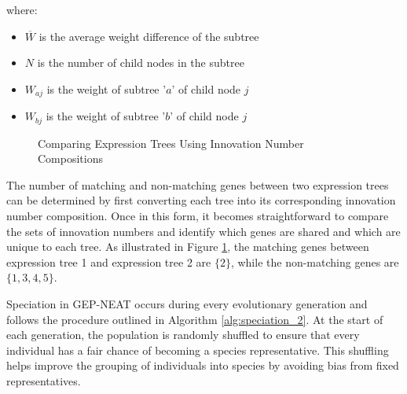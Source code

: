 \noindent where:
\begin{itemize}
	\item $\overline{W}$ is the average weight difference of the subtree
	\item $N$ is the number of child nodes in the subtree
	\item $W_{aj}$ is the weight of subtree '$a$' of child node $j$
	\item $W_{bj}$ is the weight of subtree '$b$' of child node $j$
\end{itemize} 

\parbreak
\begin{figure}[H] %
	\centering %
	\caption{Comparing Expression Trees Using Innovation Number Compositions}
	\label{fig:gep_neat_innovation_number_compare} %
\end{figure}

\parbreak\noindent The number of matching and non-matching genes between two expression trees can be determined by first converting each tree into its corresponding innovation number composition. Once in this form, it becomes straightforward to compare the sets of innovation numbers and identify which genes are shared and which are unique to each tree. As illustrated in Figure \ref{fig:gep_neat_innovation_number_compare}, the matching genes between expression tree 1 and expression tree 2 are $\{2\}$, while the non-matching genes are $\{1, 3, 4, 5\}$.

\parbreak\noindent Speciation in GEP-NEAT occurs during every evolutionary generation and follows the procedure outlined in Algorithm \ref{alg:speciation_2}. At the start of each generation, the population is randomly shuffled to ensure that every individual has a fair chance of becoming a species representative. This shuffling helps improve the grouping of individuals into species by avoiding bias from fixed representatives.

